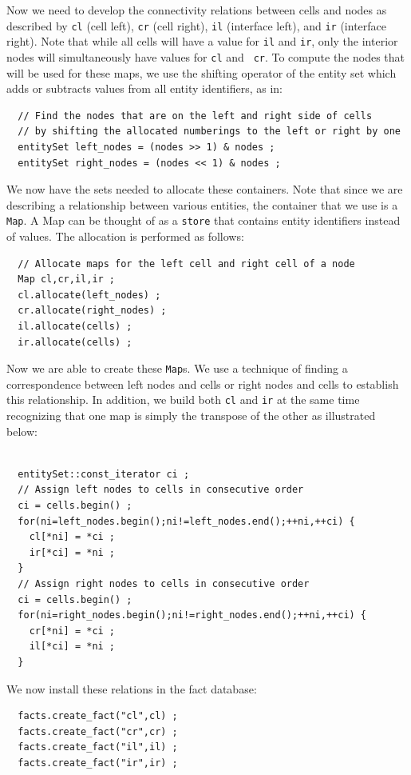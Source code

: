 \documentclass[10pt,epsf,letterpaper,twoside]{book}
\begin{document}
Now we need to develop the connectivity relations between cells and
nodes as described by {\tt cl} (cell left), {\tt cr} (cell right),
{\tt il} (interface left), and {\tt ir} (interface right).  Note that
while all cells will have a value for {\tt il} and {\tt ir}, only the
interior nodes will simultaneously have values for {\tt cl} and {\tt
  cr}.  To compute the nodes that will be used for these maps, we use
the shifting operator of the entity set which adds or subtracts values
from all entity identifiers, as in:
\begin{verbatim}
  // Find the nodes that are on the left and right side of cells
  // by shifting the allocated numberings to the left or right by one
  entitySet left_nodes = (nodes >> 1) & nodes ;
  entitySet right_nodes = (nodes << 1) & nodes ;
\end{verbatim}
We now have the sets needed to allocate these containers.  Note that
since we are describing a relationship between various entities, the
container that we use is a {\tt Map}.  A Map can be thought of as a
{\tt store} that contains entity identifiers instead of values.  The
allocation is performed as follows:
\begin{verbatim}
  // Allocate maps for the left cell and right cell of a node
  Map cl,cr,il,ir ;
  cl.allocate(left_nodes) ;
  cr.allocate(right_nodes) ;
  il.allocate(cells) ;
  ir.allocate(cells) ;
\end{verbatim}
Now we are able to create these {\tt Map}s.  We use a technique of
finding a correspondence between left nodes and cells or right nodes
and cells to establish this relationship.  In addition, we build both
{\tt cl} and {\tt ir} at the same time recognizing that one map is
simply the transpose of the other as illustrated below:
\begin{verbatim}

  entitySet::const_iterator ci ;
  // Assign left nodes to cells in consecutive order
  ci = cells.begin() ;
  for(ni=left_nodes.begin();ni!=left_nodes.end();++ni,++ci) {
    cl[*ni] = *ci ;
    ir[*ci] = *ni ;
  }
  // Assign right nodes to cells in consecutive order
  ci = cells.begin() ;
  for(ni=right_nodes.begin();ni!=right_nodes.end();++ni,++ci) {
    cr[*ni] = *ci ;
    il[*ci] = *ni ;
  }
\end{verbatim}
We now install these relations in the fact database:
\begin{verbatim}
  facts.create_fact("cl",cl) ;
  facts.create_fact("cr",cr) ;
  facts.create_fact("il",il) ;
  facts.create_fact("ir",ir) ;
\end{verbatim}
\end{document}

